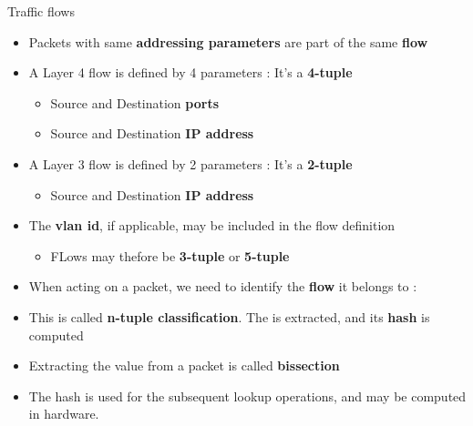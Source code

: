 \begin{frame}{Traffic flows}
	\begin{itemize}
		\item Packets with same \textbf{addressing parameters} are part of the same \textbf{flow}
		\item A Layer 4 flow is defined by 4 parameters : It's a \textbf{4-tuple}
			\begin{itemize}
				\item Source and Destination \textbf{ports}
				\item Source and Destination \textbf{IP address}
			\end{itemize}
		\item A Layer 3 flow is defined by 2 parameters : It's a \textbf{2-tuple}
			\begin{itemize}
				\item Source and Destination \textbf{IP address}
			\end{itemize}
		\item The \textbf{vlan id}, if applicable, may be included in the flow definition
			\begin{itemize}
				\item FLows may thefore be \textbf{3-tuple} or \textbf{5-tuple}
			\end{itemize}
		\item When acting on a packet, we need to identify the \textbf{flow} it belongs to :
		\item This is called \textbf{n-tuple classification}. The  is extracted, and its \textbf{hash} is computed
		\item Extracting the  value from a packet is called \textbf{bissection}
		\item The hash is used for the subsequent lookup operations, and may be computed in hardware.
	\end{itemize}
\end{frame}

